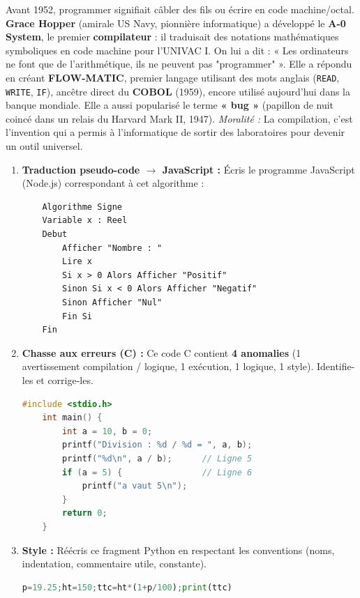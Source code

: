 \documentclass[11pt]{article}
\begin{document}
\begin{savaistu}
Avant 1952, programmer signifiait câbler des fils ou écrire en code machine/octal. \textbf{Grace Hopper} (amirale US Navy, pionnière informatique) a développé le \textbf{A-0 System}, le premier \textbf{compilateur} : il traduisait des notations mathématiques symboliques en code machine pour l'UNIVAC I. On lui a dit : « Les ordinateurs ne font que de l'arithmétique, ils ne peuvent pas "programmer" ». Elle a répondu en créant \textbf{FLOW-MATIC}, premier langage utilisant des mots anglais (\texttt{READ}, \texttt{WRITE}, \texttt{IF}), ancêtre direct du \textbf{COBOL} (1959), encore utilisé aujourd'hui dans la banque mondiale. Elle a aussi popularisé le terme \textbf{« bug »} (papillon de nuit coincé dans un relais du Harvard Mark II, 1947). \emph{Moralité :} La compilation, c'est l'invention qui a permis à l'informatique de sortir des laboratoires pour devenir un outil universel.
\end{savaistu}

\begin{exercice}
\begin{enumerate}
    \item \textbf{Traduction pseudo-code $\to$ JavaScript :} Écris le programme JavaScript (Node.js) correspondant à cet algorithme :
    \begin{lstlisting}
    Algorithme Signe
    Variable x : Reel
    Debut
        Afficher "Nombre : "
        Lire x
        Si x > 0 Alors Afficher "Positif"
        Sinon Si x < 0 Alors Afficher "Negatif"
        Sinon Afficher "Nul"
        Fin Si
    Fin
    \end{lstlisting}
    \item \textbf{Chasse aux erreurs (C) :} Ce code C contient \textbf{4 anomalies} (1 avertissement compilation / logique, 1 exécution, 1 logique, 1 style). Identifie-les et corrige-les.
    \begin{lstlisting}[language=C]
    #include <stdio.h>
    int main() {
        int a = 10, b = 0;
        printf("Division : %d / %d = ", a, b);
        printf("%d\n", a / b);      // Ligne 5
        if (a = 5) {                // Ligne 6
            printf("a vaut 5\n");
        }
        return 0;
    }
    \end{lstlisting}
    \item \textbf{Style :} Réécris ce fragment Python en respectant les conventions (noms, indentation, commentaire utile, constante).
    \begin{lstlisting}[language=Python]
    p=19.25;ht=150;ttc=ht*(1+p/100);print(ttc)
    \end{lstlisting}
\end{enumerate}
\end{exercice}
\end{document}

